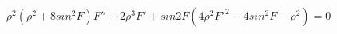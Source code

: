 \begin{equation}
\rho^2 (\rho^2 +8 sin^2F) F'' +2\rho^3 F' + sin2F(4\rho^2 F'^2 -4 sin^2F-\rho^2)=0  \label{eq:shape}
\end{equation}

